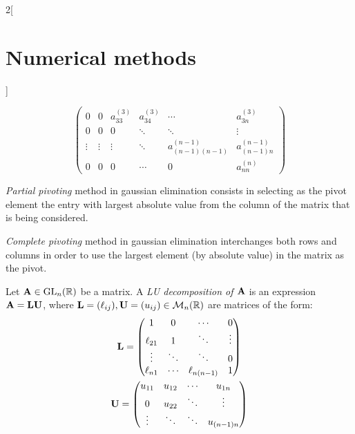 \documentclass[../../../main.tex]{subfiles}
\begin{document}
\begin{multicols}{2}[\section{Numerical methods}]
\begin{method}
$$\begin{pmatrix}
        0            & 0            & a_{33}^{(3)} & a_{34}^{(3)} & \cdots                 & a_{3n}^{(3)}       \\
        0            & 0            & 0            & \ddots       & \ddots                 & \vdots             \\
        \vdots       & \vdots       & \vdots       & \ddots       & a_{(n-1)(n-1)}^{(n-1)} & a_{(n-1)n}^{(n-1)} \\
        0            & 0            & 0            & \cdots       & 0                      & a_{nn}^{(n)}
      \end{pmatrix}
    $$
  \end{method}
  \begin{method}
    \textit{Partial pivoting} method in gaussian elimination consists in selecting as the pivot element the entry with largest absolute value from the column of the matrix that is being considered.
  \end{method}
  \begin{method}
    \textit{Complete pivoting} method in gaussian elimination interchanges both rows and columns in order to use the largest element (by absolute value) in the matrix as the pivot.
  \end{method}
  \begin{definition}[LU descompostion]
    Let $\boldsymbol{\mathrm{A}}\in\mathrm{GL}_n(\mathbb{R})$ be a matrix. A \textit{LU decomposition of $\boldsymbol{\mathrm{A}}$} is an expression $\boldsymbol{\mathrm{A}}=\boldsymbol{\mathrm{L}}\boldsymbol{\mathrm{U}}$, where $\boldsymbol{\mathrm{L}}=(\ell_{ij}),\boldsymbol{\mathrm{U}}=(u_{ij})\in\mathcal{M}_n(\mathbb{R})$ are matrices of the form:
    \begin{gather}\label{NM_L}
      \boldsymbol{\mathrm{L}}=
      \begin{pmatrix}
        1         & 0      & \cdots        & 0      \\
        \ell_{21} & 1      & \ddots        & \vdots \\
        \vdots    & \ddots & \ddots        & 0      \\
        \ell_{n1} & \cdots & \ell_{n(n-1)} & 1
      \end{pmatrix}\\\label{NM_U}
      \boldsymbol{\mathrm{U}}=
      \begin{pmatrix}
        u_{11} & u_{12} & \cdots & u_{1n}     \\
        0      & u_{22} & \ddots & \vdots     \\
        \vdots & \ddots & \ddots & u_{(n-1)n} \\

\end{pmatrix}
\end{gather}
\end{definition}
\end{multicols}
\end{document}
